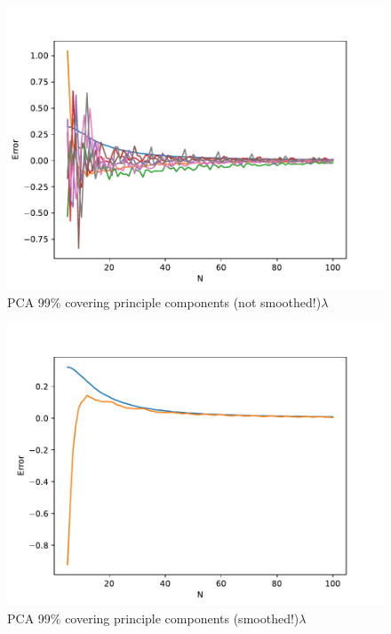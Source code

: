 \documentclass{tran-l}
\theoremstyle{definition}
\theoremstyle{remark}
\numberwithin{equation}{section}
\begin{document}
\begin{figure}[h!]
   \centering
   \includegraphics[width=\textwidth]{Figures/initial_study/lc_pca.pdf}
   \caption{PCA 99\% covering principle components (not smoothed!)$\lambda$}
\end{figure}

\begin{figure}[h!]
   \centering
   \includegraphics[width=\textwidth]{Figures/initial_study/smooth_pca.pdf}
   \caption{PCA 99\% covering principle components (smoothed!)$\lambda$}
\end{figure}
\end{document}
